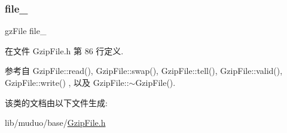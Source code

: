 \subsubsection{\texorpdfstring{file\+\_\+}{file\_}}
{\footnotesize\ttfamily gz\+File file\+\_\+\hspace{0.3cm}{\ttfamily [private]}}



在文件 Gzip\+File.\+h 第 86 行定义.



参考自 Gzip\+File\+::read(), Gzip\+File\+::swap(), Gzip\+File\+::tell(), Gzip\+File\+::valid(), Gzip\+File\+::write() , 以及 Gzip\+File\+::$\sim$\+Gzip\+File().



该类的文档由以下文件生成\+:\begin{DoxyCompactItemize}
\item 
lib/muduo/base/\hyperlink{GzipFile_8h}{Gzip\+File.\+h}\end{DoxyCompactItemize}
